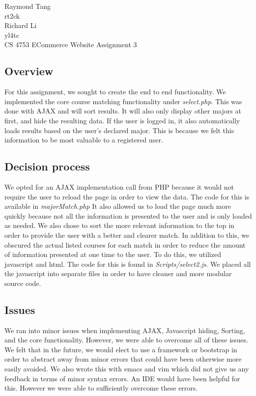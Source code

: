 \documentclass{article}
\begin{document}
\begin{singlespace}
\noindent Raymond Tang\\
rt2ck\\
Richard Li\\
yl4tc\\
CS 4753 ECommerce Website Assignment 3
\end{singlespace}

\begin{doublespace}
\subsection*{Overview}
\indent For this assignment, we sought to create the end to end functionality. We implemented the core course matching functionality under \emph{select.php}. This was done with AJAX and will sort results. It will also only display other majors at first, and hide the resulting data. If the user is logged in, it also automatically loads results based on the user's declared major. This is because we felt this information to be most valuable to a registered user.\\

\subsection*{Decision process}
\indent We opted for an AJAX implementation call from PHP because it would not require the user to reload the page in order to view the data. The code for this is available in \emph{majorMatch.php} It also allowed us to load the page much more quickly because not all the information is presented to the user and is only loaded as needed. We also chose to sort the more relevant information to the top in order to provide the user with a better and clearer match. In addition to this, we obscured the actual listed courses for each match in order to reduce the amount of information presented at one time to the user. To do this, we utilized javascript and html. The code for this is found in \emph{Scripts/select2.js}. We placed all the javascript into separate files in order to have cleaner and more modular source code.\\

\subsection*{Issues}
\indent We ran into minor issues when implementing AJAX, Javascript hiding, Sorting, and the core functionality. However, we were able to overcome all of these issues. We felt that in the future, we would elect to use a framework or bootstrap in order to abstract away from minor errors that could have been otherwise more easily avoided. We also wrote this with emacs and vim which did not give us any feedback in terms of minor syntax errors. An IDE would have been helpful for this. However we were able to sufficiently overcome these errors.\\


\end{doublespace}
\end{document}
